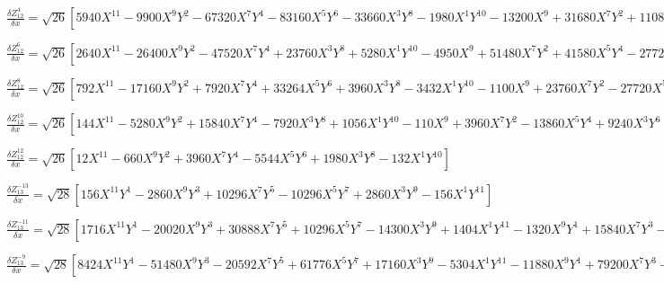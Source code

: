 \documentclass[10pt,landscape]{article}
\begin{document}
\vspace{1.2 mm}
\noindent $ \frac{\delta Z^{4}_{12}}{\delta x} = \sqrt{26} [5940X^{11} -9900X^{9}Y^{2} -67320X^{7}Y^{4} -83160X^{5}Y^{6} -33660X^{3}Y^{8} -1980X^{1}Y^{10} -13200X^{9} +31680X^{7}Y^{2} +110880X^{5}Y^{4} +73920X^{3}Y^{6} +7920X^{1}Y^{8} +10080X^{7} -30240X^{5}Y^{2} -50400X^{3}Y^{4} -10080X^{1}Y^{6} -3024X^{5} +10080X^{3}Y^{2} +5040X^{1}Y^{4} +280X^{3} -840X^{1}Y^{2}] $

\vspace{1.2 mm}
\noindent $ \frac{\delta Z^{6}_{12}}{\delta x} = \sqrt{26} [2640X^{11} -26400X^{9}Y^{2} -47520X^{7}Y^{4} +23760X^{3}Y^{8} +5280X^{1}Y^{10} -4950X^{9} +51480X^{7}Y^{2} +41580X^{5}Y^{4} -27720X^{3}Y^{6} -12870X^{1}Y^{8} +2880X^{7} -30240X^{5}Y^{2} +10080X^{1}Y^{6} -504X^{5} +5040X^{3}Y^{2} -2520X^{1}Y^{4}] $

\vspace{1.2 mm}
\noindent $ \frac{\delta Z^{8}_{12}}{\delta x} = \sqrt{26} [792X^{11} -17160X^{9}Y^{2} +7920X^{7}Y^{4} +33264X^{5}Y^{6} +3960X^{3}Y^{8} -3432X^{1}Y^{10} -1100X^{9} +23760X^{7}Y^{2} -27720X^{5}Y^{4} -18480X^{3}Y^{6} +5940X^{1}Y^{8} +360X^{7} -7560X^{5}Y^{2} +12600X^{3}Y^{4} -2520X^{1}Y^{6}] $

\vspace{1.2 mm}
\noindent $ \frac{\delta Z^{10}_{12}}{\delta x} = \sqrt{26} [144X^{11} -5280X^{9}Y^{2} +15840X^{7}Y^{4} -7920X^{3}Y^{8} +1056X^{1}Y^{10} -110X^{9} +3960X^{7}Y^{2} -13860X^{5}Y^{4} +9240X^{3}Y^{6} -990X^{1}Y^{8}] $

\vspace{1.2 mm}
\noindent $ \frac{\delta Z^{12}_{12}}{\delta x} = \sqrt{26} [12X^{11} -660X^{9}Y^{2} +3960X^{7}Y^{4} -5544X^{5}Y^{6} +1980X^{3}Y^{8} -132X^{1}Y^{10}] $

\vspace{1.2 mm}
\noindent $ \frac{\delta Z^{-13}_{13}}{\delta x} = \sqrt{28} [156X^{11}Y^{1} -2860X^{9}Y^{3} +10296X^{7}Y^{5} -10296X^{5}Y^{7} +2860X^{3}Y^{9} -156X^{1}Y^{11}] $

\vspace{1.2 mm}
\noindent $ \frac{\delta Z^{-11}_{13}}{\delta x} = \sqrt{28} [1716X^{11}Y^{1} -20020X^{9}Y^{3} +30888X^{7}Y^{5} +10296X^{5}Y^{7} -14300X^{3}Y^{9} +1404X^{1}Y^{11} -1320X^{9}Y^{1} +15840X^{7}Y^{3} -33264X^{5}Y^{5} +15840X^{3}Y^{7} -1320X^{1}Y^{9}] $

\vspace{1.2 mm}
\noindent $ \frac{\delta Z^{-9}_{13}}{\delta x} = \sqrt{28} [8424X^{11}Y^{1} -51480X^{9}Y^{3} -20592X^{7}Y^{5} +61776X^{5}Y^{7} +17160X^{3}Y^{9} -5304X^{1}Y^{11} -11880X^{9}Y^{1} +79200X^{7}Y^{3} -33264X^{5}Y^{5} -47520X^{3}Y^{7} +9240X^{1}Y^{9} +3960X^{7}Y^{1} -27720X^{5}Y^{3} +27720X^{3}Y^{5} -3960X^{1}Y^{7}] $
\end{document}
